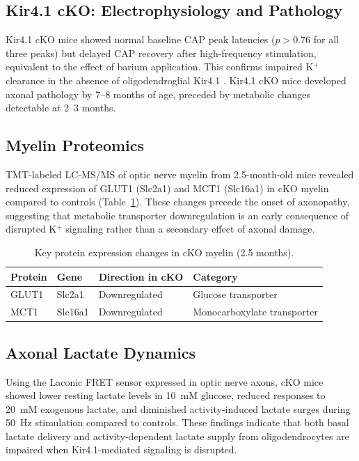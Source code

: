 \documentclass[12pt]{article}
\begin{document}
\subsection{Kir4.1 cKO: Electrophysiology and Pathology}

Kir4.1 cKO mice showed normal baseline CAP peak latencies ($p > 0.76$ for all three peaks) but delayed CAP recovery after high-frequency stimulation, equivalent to the effect of barium application. This confirms impaired K$^+$ clearance in the absence of oligodendroglial Kir4.1 \citep{larson2018oligodendrocytes}. Kir4.1 cKO mice developed axonal pathology by 7--8 months of age, preceded by metabolic changes detectable at 2--3 months.

\subsection{Myelin Proteomics}

TMT-labeled LC-MS/MS of optic nerve myelin from 2.5-month-old mice revealed reduced expression of GLUT1 (Slc2a1) and MCT1 (Slc16a1) in cKO myelin compared to controls (Table~\ref{tab:proteomics}). These changes precede the onset of axonopathy, suggesting that metabolic transporter downregulation is an early consequence of disrupted K$^+$ signaling rather than a secondary effect of axonal damage.

\begin{table}[ht]
\centering
\caption{Key protein expression changes in cKO myelin (2.5 months).}
\label{tab:proteomics}
\begin{tabular}{llll}
\toprule
Protein & Gene & Direction in cKO & Category \\
\midrule
GLUT1 & Slc2a1 & Downregulated & Glucose transporter \\
MCT1 & Slc16a1 & Downregulated & Monocarboxylate transporter \\
\bottomrule
\end{tabular}
\end{table}

\subsection{Axonal Lactate Dynamics}

Using the Laconic FRET sensor expressed in optic nerve axons, cKO mice showed lower resting lactate levels in 10~mM glucose, reduced responses to 20~mM exogenous lactate, and diminished activity-induced lactate surges during 50~Hz stimulation compared to controls. These findings indicate that both basal lactate delivery and activity-dependent lactate supply from oligodendrocytes are impaired when Kir4.1-mediated signaling is disrupted.
\end{document}
